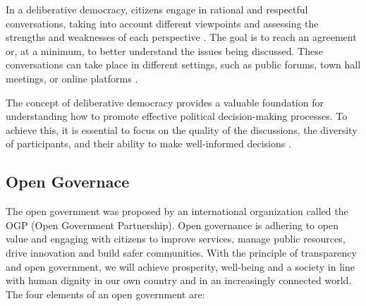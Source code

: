 \documentclass{IEEEtran}
\begin{document}
In a deliberative democracy, citizens engage in rational and respectful conversations, taking into account different viewpoints and assessing the strengths and weaknesses of each perspective \cite{mansbridge2012systemic}. The goal is to reach an agreement or, at a minimum, to better understand the issues being discussed. These conversations can take place in different settings, such as public forums, town hall meetings, or online platforms \cite{neblo2010who}.

The concept of deliberative democracy provides a valuable foundation for understanding how to promote effective political decision-making processes. To achieve this, it is essential to focus on the quality of the discussions, the diversity of participants, and their ability to make well-informed decisions \cite{dryzek2000deliberative}.



\subsection{Open Governace} 
The open government was proposed by an international organization called the OGP (Open Government Partnership). 
Open governance is adhering to open value and engaging with citizens to improve services, manage public resources, drive innovation and build safer communities. With the principle of transparency and open government, we will achieve prosperity, well-being and a society in line with human dignity in our own country and in an increasingly connected world.
The four elements of an open government are:
\end{document}

